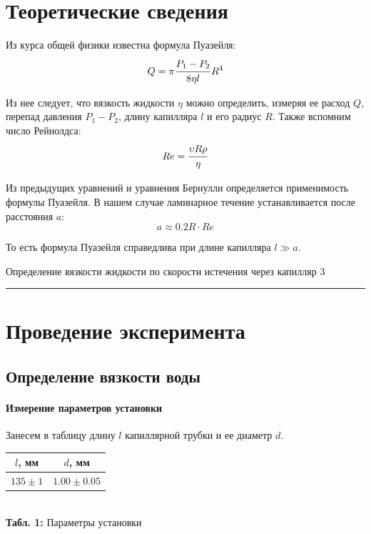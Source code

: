 \documentclass[12pt,a4paper]{scrartcl}
\begin{document}
	\section{Теоретические сведения}
	
	Из курса общей физики известна формула Пуазейля:
	$$Q = \pi\dfrac{\strut P_1 - P_2}{\strut 8\eta l}R^4$$
	
	Из нее следует, что вязкость жидкости $\eta$ можно определить, измеряя ее расход $Q$, перепад давления $P_1 - P_2$, длину капилляра $l$ и его радиус $R$. Также вспомним число Рейнолдса:
	$$Re = \dfrac{\strut \upsilon R \rho}{\strut \eta}$$
	
	Из предыдущих уравнений и уравнения Бернулли определяется применимость формулы Пуазейля. В нашем случае ламинарное течение устанавливается после расстояния $a$:
	$$a \approx 0.2 R \cdot Re$$
	
	То есть формула Пуазейля справедлива при длине капилляра $l \gg a$.
	
	
	\newpage
	
	\begin{flushleft}
		\footnotesize{Определение вязкости жидкости по скорости истечения через капилляр} \hspace{\fill} \footnotesize{3}
		\\[-0.3cm]\noindent\rule{\textwidth}{0.3pt}
	\end{flushleft}
	
	\section{Проведение эксперимента}
	
	\subsection{Определение вязкости воды}
	
	\paragraph{Измерение параметров установки} \hfill
	
	Занесем в таблицу длину $l$ капиллярной трубки и ее диаметр $d$.
	\begin{center}
		\begin{tabular}{|c|c|}
			\hline
			$l$, мм & $d$, мм \\\hline
			$135 \pm 1$ & $1.00 \pm 0.05$ \\\hline
		\end{tabular}
		\\\textbf{Табл. 1:} Параметры установки 
	\end{center} 
\end{document}
